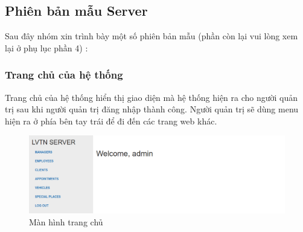 \documentclass[a4paper]{article}
\begin{document}
\subsection{Phiên bản mẫu Server}
Sau đây nhóm xin trình bày một số phiên bản mẫu (phần còn lại vui lòng xem lại ở phụ lục phần 4) :
\subsubsection{Trang chủ của hệ thống}
Trang chủ của hệ thống hiển thị giao diện mà hệ thống hiện ra cho người quản trị sau khi người quản trị đăng nhập thành công. Người quản trị sẽ dùng menu hiện ra ở phía
bên tay trái để đi đến các trang web khác.

\begin{figure}[H]
\centering
\includegraphics[scale=0.5]{admin/admin_trangchu}
\caption{Màn hình trang chủ}
\end{figure}
\end{document}
